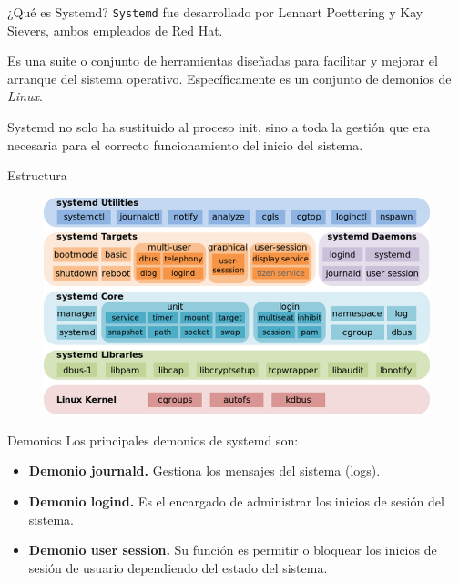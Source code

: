 \documentclass[11pt]{beamer}
\begin{document}
\begin{frame}{¿Qué es Systemd?} %
\texttt{Systemd} fue desarrollado por Lennart Poettering y Kay Sievers, ambos empleados de Red Hat.

\vspace{0.5cm}

Es una suite o conjunto de herramientas diseñadas para facilitar y mejorar el arranque del sistema operativo. Específicamente es un conjunto de demonios de \textit{Linux}.

\vspace{0.5cm}

Systemd no solo ha sustituido al proceso init, sino a toda la gestión que era necesaria para el correcto funcionamiento del inicio del sistema.

\end{frame}

\begin{frame}{Estructura} %

\begin{figure}[H] %
\centering
\includegraphics[scale=0.42]{../imagenes/systemd_components.png} 
 \label{fig:systemd_components}
\end{figure}

\end{frame}

\begin{frame}{Demonios} %
Los principales demonios de systemd son:
\vspace{0.5cm}
\begin{itemize}
\item \textbf{Demonio journald.} Gestiona los mensajes del sistema (logs).
\item \textbf{Demonio logind.} Es el encargado de administrar los inicios de sesión del sistema.
\item \textbf{Demonio user session.} Su función es permitir o bloquear los inicios de sesión de usuario dependiendo del estado del sistema.
\end{itemize}
\end{frame}
\end{document}

